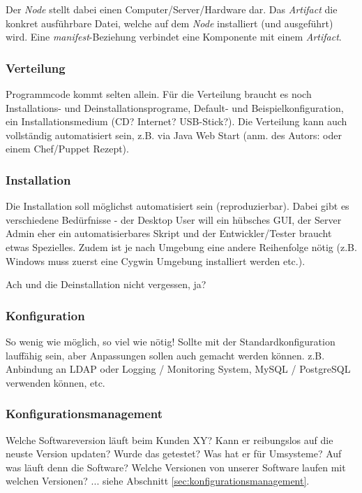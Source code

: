 
Der \emph{Node} stellt dabei einen Computer/Server/Hardware dar. Das \emph{Artifact} die konkret ausführbare Datei, welche auf dem \emph{Node} installiert (und ausgeführt) wird. Eine \emph{manifest}-Beziehung verbindet eine Komponente mit einem \emph{Artifact}.

\subsubsection{Verteilung}
Programmcode kommt selten allein. Für die Verteilung braucht es noch Installations- und Deinstallationsprograme, Default- und Beispielkonfiguration, ein Installationsmedium (CD? Internet? USB-Stick?). Die Verteilung kann auch vollständig automatisiert sein, z.B. via Java Web Start (anm. des Autors: oder einem Chef/Puppet Rezept).

\subsubsection{Installation}
Die Installation soll möglichst automatisiert sein (reproduzierbar). Dabei gibt es verschiedene Bedürfnisse - der Desktop User will ein hübsches GUI, der Server Admin eher ein automatisierbares Skript und der Entwickler/Tester braucht etwas Spezielles. Zudem ist je nach Umgebung eine andere Reihenfolge nötig (z.B. Windows muss zuerst eine Cygwin Umgebung installiert werden etc.). 

Ach und die Deinstallation nicht vergessen, ja?

\subsubsection{Konfiguration}
So wenig wie möglich, so viel wie nötig! Sollte mit der Standardkonfiguration lauffähig sein, aber Anpassungen sollen auch gemacht werden können. z.B. Anbindung an LDAP oder Logging / Monitoring System, MySQL / PostgreSQL verwenden können, etc.

\subsubsection{Konfigurationsmanagement}
Welche Softwareversion läuft beim Kunden XY? Kann er reibungslos auf die neuste Version updaten? Wurde das getestet? Was hat er für Umsysteme? Auf was läuft denn die Software? Welche Versionen von unserer Software laufen mit welchen Versionen? ... siehe Abschnitt \ref{sec:konfigurationsmanagement}.

